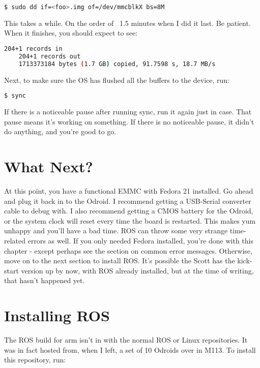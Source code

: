 \begin{lstlisting}[language=bash]
  $ sudo dd if=<foo>.img of=/dev/mmcblkX bs=8M
\end{lstlisting}

This takes a while. On the order of ~1.5 minutes when I did it last. Be patient. When it finishes, you should expect to see:
\begin{lstlisting}[language=bash]
    204+1 records in
    204+1 records out
    1713373184 bytes (1.7 GB) copied, 91.7598 s, 18.7 MB/s
\end{lstlisting}

Next, to make sure the OS has flushed all the buffers to the device, run:

\begin{lstlisting}[language=bash]
  $ sync
\end{lstlisting}

If there is a noticeable pause after running sync, run it again just in case. That pause means it's working on something. If there is no noticeable pause, it didn't do anything, and you're good to go.

\section{What Next?}

At this point, you have a functional EMMC with Fedora 21 installed. Go ahead and plug it back in to the Odroid. I recommend getting a USB-Serial converter cable to debug with. I also recommend getting a CMOS battery for the Odroid, or the system clock will reset every time the board is restarted. This makes yum unhappy and you'll have a bad time. ROS can throw some very strange time-related errors as well. If you only needed Fedora installed, you're done with this chapter - except perhaps see the section on common error messages. Otherwise, move on to the next section to install ROS. It's possible the Scott has the kick-start version up by now, with ROS already installed, but at the time of writing, that hasn't happened yet.

\section{Installing ROS}

The ROS build for arm isn't in with the normal ROS or Linux repositories. It was in fact hosted from, when I left, a set of 10 Odroids over in M113. To install this repository, run:

